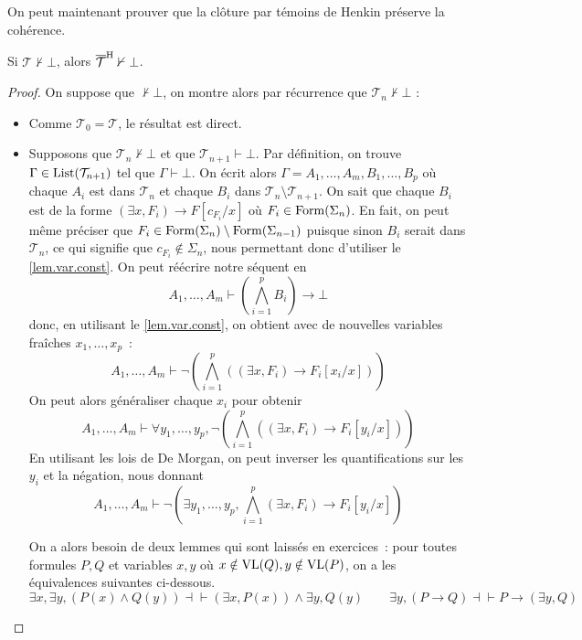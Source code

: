On peut maintenant prouver que la clôture par témoins de Henkin préserve la
cohérence.

\begin{property}
  Si $\mathcal T\nvdash \bot$, alors $\overline{\mathcal T}^{\mathrm H}\nvdash\bot$.
\end{property}

\begin{proof}
  On suppose que $\mathcal \nvdash\bot$, on montre alors par récurrence que
  $\mathcal T_n\not\vdash\bot$ :
  \begin{itemize}
  \item Comme $\mathcal T_0 =\mathcal T$, le résultat est direct.
  \item Supposons que $\mathcal T_n\not\vdash\bot$ et que
    $\mathcal T_{n+1}\vdash\bot$. Par définition, on trouve
    $\Gamma\in\operatorname{List}(\mathcal T_{n+1})$ tel que $\Gamma\vdash\bot$. On écrit
    alors $\Gamma = A_1,\ldots,A_m,B_1,\ldots,B_p$ où chaque $A_i$ est dans
    $\mathcal T_n$ et chaque $B_i$ dans
    $\mathcal T_n\setminus\mathcal T_{n+1}$. On sait que chaque $B_i$ est de
    la forme $(\exists x,F_i)\to F[c_{F_i}/x]$ où $F_i\in\operatorname{Form}(\Sigma_n)$.
    En fait, on peut même préciser que
    $F_i \in\operatorname{Form}(\Sigma_n)\setminus\operatorname{Form}(\Sigma_{n-1})$ puisque
    sinon $B_i$ serait dans $\mathcal T_n$, ce qui signifie que
    $c_{F_i}\notin\Sigma_n$, nous permettant donc d'utiliser le
    \cref{lem.var.const}. On peut réécrire notre séquent en
    \[A_1,\ldots,A_m\vdash \left(\bigwedge_{i=1}^p B_i\right) \to \bot\]
    donc, en utilisant le \cref{lem.var.const}, on obtient avec de nouvelles
    variables fraîches $x_1,\ldots,x_p$~:
    \[A_1,\ldots,A_m\vdash
    \lnot \left(\bigwedge_{i = 1}^p ((\exists x, F_i)\to F_i[x_i/x])\right)\]
    On peut alors généraliser chaque $x_i$ pour obtenir
    \[A_1,\ldots,A_m\vdash \forall y_1,\ldots,y_p, \lnot \left(
    \bigwedge_{i = 1}^p ((\exists x, F_i) \to F_i[y_i/x])\right)\]
    En utilisant les lois de De Morgan, on peut inverser les quantifications sur
    les $y_i$ et la négation, nous donnant
    \begin{equation}\label{eq.henk}
      A_1,\ldots,A_m\vdash \lnot \left(\exists y_1,\ldots,y_p,
      \bigwedge_{i = 1}^p (\exists x, F_i) \to F_i[y_i/x]\right)
    \end{equation}

    On a alors besoin de deux lemmes qui sont laissés en exercices~: pour toutes
    formules $P,Q$ et variables $x,y$ où $x\notin\operatorname{VL}(Q), y \notin\operatorname{VL}(P)$, on
    a les équivalences suivantes ci-dessous.
    \[\exists x, \exists y, (P(x)\land Q(y)) \dashv\vdash (\exists x,P(x))\land
    \exists y,Q(y)
    \qquad \exists y, (P \to Q) \dashv\vdash P \to (\exists y, Q)\]


\end{itemize}
\end{proof}
